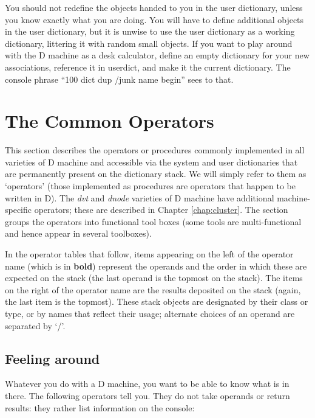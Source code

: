 You should not redefine the objects handed to you in the user dictionary, unless you know exactly what you are doing. You will have to define additional objects in the user dictionary, but it is unwise to use the user dictionary as a working dictionary, littering it with random small objects. If you want to play around with the D machine as a desk calculator, define an empty dictionary for your new associations, reference it in userdict, and make it the current dictionary. The console phrase ``100 dict dup /junk name begin'' sees to that.


\section{The Common Operators}\label{sec:operators}

This section describes the operators or procedures commonly implemented in all varieties of D machine and accessible via the system and user dictionaries that are permanently present on the dictionary stack. We will simply refer to them as `operators' (those implemented as procedures are operators that happen to be written in D). The \emph{dvt} and \emph{dnode} varieties of D machine have additional machine-specific operators; these are described in Chapter \ref{chap:cluster}. The section groups the operators into functional tool boxes (some tools are multi-functional and hence appear in several toolboxes).

In the operator tables that follow, items appearing on the left of  the operator  name (which is in \textbf{bold}) represent the operands and the order  in which these are expected on the stack (the last operand is the topmost  on the stack). The items on the right of the operator name  are the results deposited on the stack (again,  the last item is the topmost). These stack objects are designated by their class or type, or by names that reflect their usage;  alternate choices of an operand are separated by `/'.



\subsection{Feeling around}

Whatever you do with a D machine, you want to be able to know what is in there. The following operators tell you. They do not take operands or return results: they rather list information on the console:\\

